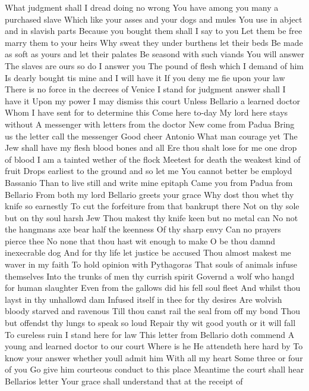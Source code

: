 What judgment shall I dread doing no wrong 
You have among you many a purchased slave 
Which like your asses and your dogs and mules 
You use in abject and in slavish parts 
Because you bought them shall I say to you 
Let them be free marry them to your heirs 
Why sweat they under burthens let their beds 
Be made as soft as yours and let their palates 
Be seasond with such viands You will answer 
The slaves are ours so do I answer you 
The pound of flesh which I demand of him 
Is dearly bought tis mine and I will have it 
If you deny me fie upon your law 
There is no force in the decrees of Venice 
I stand for judgment answer shall I have it 
Upon my power I may dismiss this court 
Unless Bellario a learned doctor 
Whom I have sent for to determine this 
Come here to-day 
My lord here stays without 
A messenger with letters from the doctor 
New come from Padua 
Bring us the letter call the messenger 
Good cheer Antonio What man courage yet 
The Jew shall have my flesh blood bones and all 
Ere thou shalt lose for me one drop of blood 
I am a tainted wether of the flock 
Meetest for death the weakest kind of fruit 
Drops earliest to the ground and so let me 
You cannot better be employd Bassanio 
Than to live still and write mine epitaph 
Came you from Padua from Bellario 
From both my lord Bellario greets your grace 
Why dost thou whet thy knife so earnestly 
To cut the forfeiture from that bankrupt there 
Not on thy sole but on thy soul harsh Jew 
Thou makest thy knife keen but no metal can 
No not the hangmans axe bear half the keenness 
Of thy sharp envy Can no prayers pierce thee 
No none that thou hast wit enough to make 
O be thou damnd inexecrable dog 
And for thy life let justice be accused 
Thou almost makest me waver in my faith 
To hold opinion with Pythagoras 
That souls of animals infuse themselves 
Into the trunks of men thy currish spirit 
Governd a wolf who hangd for human slaughter 
Even from the gallows did his fell soul fleet 
And whilst thou layst in thy unhallowd dam 
Infused itself in thee for thy desires 
Are wolvish bloody starved and ravenous 
Till thou canst rail the seal from off my bond 
Thou but offendst thy lungs to speak so loud 
Repair thy wit good youth or it will fall 
To cureless ruin I stand here for law 
This letter from Bellario doth commend 
A young and learned doctor to our court 
Where is he 
He attendeth here hard by 
To know your answer whether youll admit him 
With all my heart Some three or four of you 
Go give him courteous conduct to this place 
Meantime the court shall hear Bellarios letter 
Your grace shall understand that at the receipt of 
